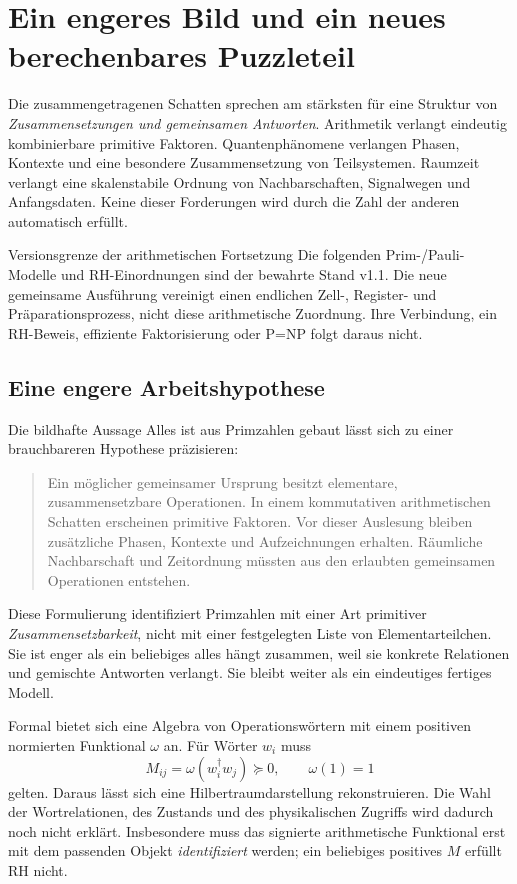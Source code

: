 \chapter{Ein engeres Bild und ein neues berechenbares Puzzleteil}
\label{ch:shadow-synthesis}
Die zusammengetragenen Schatten sprechen am stärksten für eine Struktur von \emph{Zusammensetzungen und gemeinsamen Antworten}. Arithmetik verlangt eindeutig kombinierbare primitive Faktoren. Quantenphänomene verlangen Phasen, Kontexte und eine besondere Zusammensetzung von Teilsystemen. Raumzeit verlangt eine skalenstabile Ordnung von Nachbarschaften, Signalwegen und Anfangsdaten. Keine dieser Forderungen wird durch die Zahl der anderen automatisch erfüllt.

\begin{grenze}{Versionsgrenze der arithmetischen Fortsetzung}
Die folgenden Prim-/Pauli-Modelle und RH-Einordnungen sind der bewahrte Stand v1.1. Die neue gemeinsame Ausführung vereinigt einen endlichen Zell-, Register- und Präparationsprozess, nicht diese arithmetische Zuordnung. Ihre Verbindung, ein RH-Beweis, effiziente Faktorisierung oder P=NP folgt daraus nicht.
\end{grenze}
\section{Eine engere Arbeitshypothese}
Die bildhafte Aussage \glqq Alles ist aus Primzahlen gebaut\grqq{} lässt sich zu einer brauchbareren Hypothese präzisieren:
\begin{quote}
Ein möglicher gemeinsamer Ursprung besitzt elementare, zusammensetzbare Operationen. In einem kommutativen arithmetischen Schatten erscheinen primitive Faktoren. Vor dieser Auslesung bleiben zusätzliche Phasen, Kontexte und Aufzeichnungen erhalten. Räumliche Nachbarschaft und Zeitordnung müssten aus den erlaubten gemeinsamen Operationen entstehen.
\end{quote}
 Diese Formulierung identifiziert Primzahlen mit einer Art primitiver \emph{Zusammensetzbarkeit}, nicht mit einer festgelegten Liste von Elementarteilchen. Sie ist enger als ein beliebiges \glqq alles hängt zusammen\grqq{}, weil sie konkrete Relationen und gemischte Antworten verlangt. Sie bleibt weiter als ein eindeutiges fertiges Modell.

Formal bietet sich eine Algebra von Operationswörtern mit einem positiven normierten Funktional $\omega$ an. Für Wörter $w_i$ muss
\[
 M_{ij}=\omega(w_i^\dagger w_j)\succeq0,\qquad\omega(1)=1
\]
gelten. Daraus lässt sich eine Hilbertraumdarstellung rekonstruieren. Die Wahl der Wortrelationen, des Zustands und des physikalischen Zugriffs wird dadurch noch nicht erklärt. Insbesondere muss das signierte arithmetische Funktional erst mit dem passenden Objekt \emph{identifiziert} werden; ein beliebiges positives $M$ erfüllt RH nicht.

